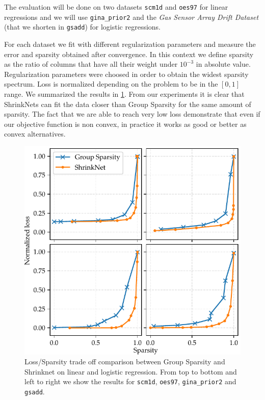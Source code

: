 The evaluation will be done on two datasets \texttt{scm1d} and \texttt{oes97}
\cite{Spyromitros-Xioufis2016} for linear regressions and we will use \texttt{gina\_prior2} \cite{4371065} and
the \textit{Gas Sensor Array Drift Dataset} \cite{VERGARA2012320} (that we shorten in
\texttt{gsadd}) for logistic regressions.

For each dataset we fit with different regularization parameters and measure
the error and sparsity obtained after convergence. In this context we define
sparsity as the ratio of columns that have all their weight under $10^{-3}$ in
absolute value. Regularization parameters were choosed in order to obtain the
widest sparsity spectrum. Loss is normalized depending on the problem to be in
the $[0, 1]$ range. We summarized the results in \cref{sparsity_accuracy}. From
our experiments it is clear that ShrinkNets can fit the data closer than Group
Sparsity for the same amount of sparsity. The fact that we are able to reach
very low loss demonstrate that even if our objective function is non convex, in
practice it works as good or better as convex alternatives.
\begin{figure}
\begin{center}
\includegraphics[width=\columnwidth]{regressions}
\vspace*{-5mm}
\caption{\label{sparsity_accuracy}Loss/Sparsity trade off comparison between Group Sparsity and Shrinknet on linear and logistic regression. From top to bottom and left to right we show the results for \texttt{scm1d}, \texttt{oes97}, \texttt{gina\_prior2} and \texttt{gsadd}.}

\end{center}
\vspace*{-4mm}
\end{figure}